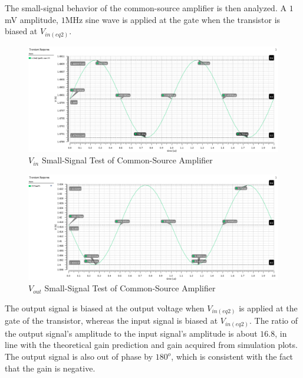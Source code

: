 The small-signal behavior of the common-source amplifier is then analyzed.
A $1$\si{\milli\volt} amplitude, $1$\si{\mega\hertz} sine wave is applied at the gate when the transistor is biased at $V_{in(eq2)}$.

\FloatBarrier

\begin{figure}[h!]
	\centering
	\includegraphics[scale=0.45]{./images/sim2_vin.PNG}
	\caption{$V_{in}$ Small-Signal Test of Common-Source Amplifier}
	\label{fig:sim2_vin}
\end{figure}

\FloatBarrier

\FloatBarrier

\begin{figure}[h!]
	\centering
	\includegraphics[scale=0.45]{./images/sim2_vout.PNG}
	\caption{$V_{out}$ Small-Signal Test of Common-Source Amplifier}
	\label{fig:sim2_vout}
\end{figure}

\FloatBarrier

The output signal is biased at the output voltage when $V_{in(eq2)}$ is applied at the gate of the transistor, whereas the input signal is biased at $V_{in(eq2)}$.
The ratio of the output signal's amplitude to the input signal's amplitude is about $16.8$, in line with the theoretical gain prediction and gain acquired from simulation plots.
The output signal is also out of phase by $180^{o}$, which is consistent with the fact that the gain is negative. \\


